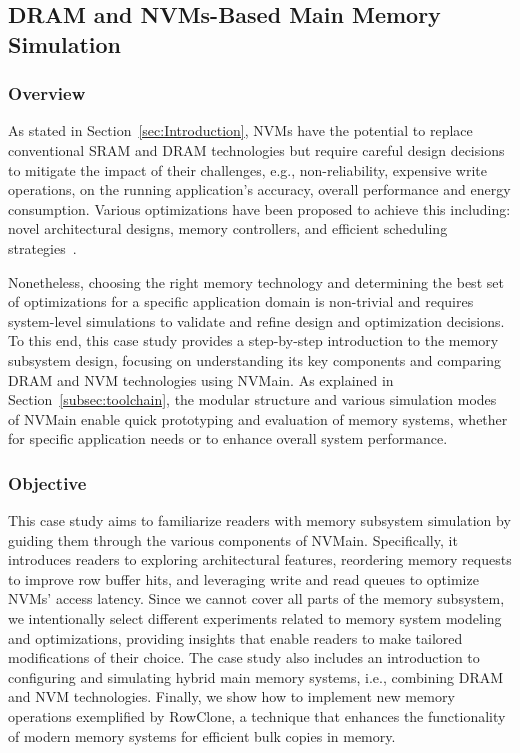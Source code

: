 \subsection{DRAM and NVMs-Based Main Memory Simulation}
\label{sec:nvm-dram}

\subsubsection{Overview}
As stated in Section~\ref{sec:Introduction}, NVMs have the potential to replace conventional SRAM and DRAM technologies but require careful design decisions to mitigate the impact of their challenges, e.g., non-reliability, expensive write operations, on the running application's accuracy, overall performance and energy consumption. Various optimizations have been proposed to achieve this including: novel architectural designs, memory controllers, and efficient scheduling strategies~\cite{5416645, 1555815}.

Nonetheless, choosing the right memory technology and determining the best set of optimizations for a specific application domain is non-trivial and requires system-level simulations to validate and refine design and optimization decisions. To this end, this case study provides a step-by-step introduction to the memory subsystem design, focusing on understanding its key components and comparing DRAM and NVM technologies using NVMain. As explained in Section~\ref{subsec:toolchain}, the modular structure and various simulation modes of NVMain enable quick prototyping and evaluation of memory systems, whether for specific application needs or to enhance overall system performance.

\subsubsection{Objective}
\label{subsubsec:tudr:objective}
This case study aims to familiarize readers with memory subsystem simulation by guiding them through the various components of NVMain. Specifically, it introduces readers to exploring architectural features, reordering memory requests to improve row buffer hits, and leveraging write and read queues to optimize NVMs' access latency. Since we cannot cover all parts of the memory subsystem, we intentionally select different experiments related to memory system modeling and optimizations, providing insights that enable readers to make tailored modifications of their choice. The case study also includes an introduction to configuring and simulating hybrid main memory systems, i.e., combining DRAM and NVM technologies. Finally, we show how to implement new memory operations exemplified by RowClone, a technique that enhances the functionality of modern memory systems for efficient bulk copies in memory.




